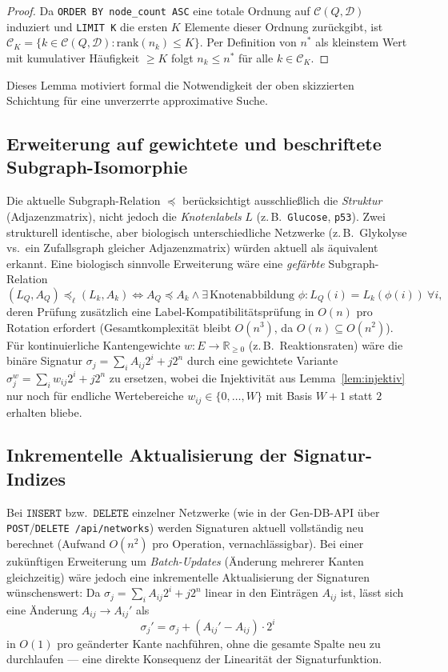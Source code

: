 \documentclass[a4paper,12pt]{article}
\theoremstyle{definition}
\begin{document}
\begin{proof}
	Da \texttt{ORDER BY node\_count ASC} eine totale Ordnung auf $\mathcal{C}(Q,\mathcal{D})$ induziert und \texttt{LIMIT K} die ersten $K$ Elemente dieser Ordnung zurückgibt, ist $\mathcal{C}_K = \{k\in\mathcal{C}(Q,\mathcal{D}): \mathrm{rank}(n_k)\le K\}$. Per Definition von $n^*$ als kleinstem Wert mit kumulativer Häufigkeit $\ge K$ folgt $n_k \le n^*$ für alle $k\in\mathcal{C}_K$.
\end{proof}

Dieses Lemma motiviert formal die Notwendigkeit der oben skizzierten Schichtung für eine unverzerrte approximative Suche.

\subsection{Erweiterung auf gewichtete und beschriftete Subgraph-Isomorphie}

Die aktuelle Subgraph-Relation $\preceq$ berücksichtigt ausschließlich die \emph{Struktur} (Adjazenzmatrix), nicht jedoch die \emph{Knotenlabels} $L$ (z.\,B.\ \texttt{Glucose}, \texttt{p53}). Zwei strukturell identische, aber biologisch unterschiedliche Netzwerke (z.\,B.\ Glykolyse vs.\ ein Zufallsgraph gleicher Adjazenzmatrix) würden aktuell als äquivalent erkannt. Eine biologisch sinnvolle Erweiterung wäre eine \emph{gefärbte} Subgraph-Relation
\[
(L_Q,A_Q)\preceq_{\ell}(L_k,A_k) \iff A_Q\preceq A_k \wedge \exists\, \text{Knotenabbildung }\phi: L_Q(i)=L_k(\phi(i))\ \forall i,
\]
deren Prüfung zusätzlich eine Label-Kompatibilitätsprüfung in $O(n)$ pro Rotation erfordert (Gesamtkomplexität bleibt $O(n^3)$, da $O(n)\subseteq O(n^2)$). Für kontinuierliche Kantengewichte $w: E\to\mathbb{R}_{\ge 0}$ (z.\,B.\ Reaktionsraten) wäre die binäre Signatur $\sigma_j=\sum_i A_{ij}2^i+j2^n$ durch eine gewichtete Variante $\sigma_j^w=\sum_i w_{ij}2^i+j2^n$ zu ersetzen, wobei die Injektivität aus Lemma~\ref{lem:injektiv} nur noch für endliche Wertebereiche $w_{ij}\in\{0,\ldots,W\}$ mit Basis $W+1$ statt $2$ erhalten bliebe.

\subsection{Inkrementelle Aktualisierung der Signatur-Indizes}

Bei $\texttt{INSERT}$ bzw.\ $\texttt{DELETE}$ einzelner Netzwerke (wie in der Gen-DB-API über \texttt{POST}/\texttt{DELETE /api/networks}) werden Signaturen aktuell vollständig neu berechnet (Aufwand $O(n^2)$ pro Operation, vernachlässigbar). Bei einer zukünftigen Erweiterung um \emph{Batch-Updates} (Änderung mehrerer Kanten gleichzeitig) wäre jedoch eine inkrementelle Aktualisierung der Signaturen wünschenswert: Da $\sigma_j=\sum_iA_{ij}2^i+j2^n$ linear in den Einträgen $A_{ij}$ ist, lässt sich eine Änderung $A_{ij}\to A_{ij}'$ als
\[
\sigma_j' = \sigma_j + (A_{ij}'-A_{ij})\cdot 2^i
\]
in $O(1)$ pro geänderter Kante nachführen, ohne die gesamte Spalte neu zu durchlaufen — eine direkte Konsequenz der Linearität der Signaturfunktion.
\end{document}
